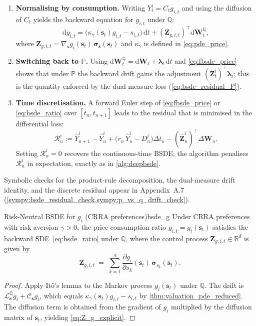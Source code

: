 \documentclass[11pt,letterpaper,oneside]{article}
\numberwithin{equation}{section}
\newcommand{\R}{\mathbb{R}}
\newcommand{\1}{\mathbf{1}}
\newcommand{\diff}{\mathrm{d}}
\begin{document}
\begin{enumerate}[label=\textbf{Step \arabic*.},wide=0pt,leftmargin=*]
  \item \textbf{Normalising by consumption.} Writing $Y_t^{i}=C_t g_{i,t}$ and using the diffusion of $C_t$ yields the backward equation for $g_{i,t}$ under $\mathbb{Q}$:
  \begin{equation}\label{eq:bsde_ratio}
    \diff g_{i,t} = \big(\kappa_\gamma(\bm{s}_t) g_{i,t} - s_{i,t}\big)\,\diff t + (\bm{Z}_{g,i,t})^{\top}\diff\bm{W}_t^{\mathbb{Q}},
  \end{equation}
  where $\bm{Z}_{g,i,t} = \nabla_{\bm{s}} g_i(\bm{s}_t)\,\bm{\sigma}_{\bm{s}}(\bm{s}_t)$ and $\kappa_\gamma$ is defined in \cref{eq:pde_price}.

  \item \textbf{Switching back to $\mathbb{P}$.} Using $\diff\bm{W}_t^{\mathbb{Q}} = \diff\bm{W}_t + \bm{\lambda}_t\,\diff t$ and \cref{eq:fbsde_price} shows that under $\mathbb{P}$ the backward drift gains the adjustment $(\bm{Z}_{t}^{i})^{\top}\bm{\lambda}_t$; this is the quantity enforced by the dual-measure loss (\cref{eq:bsde_residual_P}).

  \item \textbf{Time discretisation.} A forward Euler step of \cref{eq:fbsde_price} or \cref{eq:bsde_ratio} over $[t_n,t_{n+1}]$ leads to the residual that is minimised in the differential loss:
  \begin{equation}\label{eq:bsde_residual}
    \mathcal{R}_{n}^{i} := \widehat{Y}_{n+1}^{i} - \widehat{Y}_{n}^{i} + \big(r_n\,\widehat{Y}_{n}^{i} - D_{n}^{i}\big)\Delta t_n - (\widehat{\bm{Z}}_{n}^{i})^{\top}\Delta\bm{W}_{n}.
  \end{equation}
  Setting $\mathcal{R}_{n}^{i}=0$ recovers the continuous-time BSDE; the algorithm penalises $\mathcal{R}_{n}^{i}$ in expectation, exactly as in \cref{alg:deepbsde}.
\end{enumerate}
\noindent Symbolic checks for the product-rule decomposition, the dual-measure drift identity, and the discrete residual appear in Appendix~A.7 (\cref{sympy:bsde_residual_check,sympy:p_vs_q_drift_check}).

\begin{proposition}{Risk-Neutral BSDE for $g_i$ (CRRA preferences)}{bsde_g}
Under CRRA preferences with risk aversion $\gamma>0$, the price-consumption ratio $g_{i,t} = g_i(\bm{s}_t)$ satisfies the backward SDE~\eqref{eq:bsde_ratio} under $\mathbb{Q}$, where the control process $\bm{Z}_{g,i,t} \in \R^d$ is given by
\begin{equation}\label{eq:Z_g_explicit}
    \bm{Z}_{g,i,t} \;=\; \sum_{k=1}^N \frac{\partial g_i}{\partial s_k}(\bm{s}_t)\, \bm{\sigma}_{s_k}(\bm{s}_t).
\end{equation}
\end{proposition}
\begin{proof}
Apply It\^o's lemma to the Markov process $g_i(\bm{s}_t)$ under $\mathbb{Q}$. The drift is $\mathcal{L}_{\bm{s}}^{\mathbb{Q}} g_i + \mathcal{C}_{\bm{s}} g_i$, which equals $\kappa_\gamma(\bm{s}_t) g_{i,t} - s_{i,t}$ by \cref{thm:valuation_pde_reduced}. The diffusion term is obtained from the gradient of $g_i$ multiplied by the diffusion matrix of $\bm{s}_t$, yielding \eqref{eq:Z_g_explicit}.
\end{proof}
\end{document}
